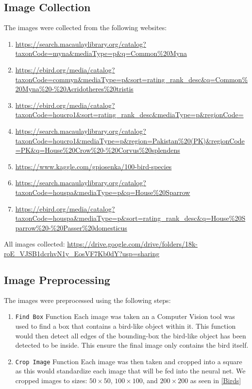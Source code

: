 \documentclass{article}
\begin{document}
    \subsection*{Image Collection}
    The images were collected from the following websites:
    \begin{enumerate}
        \item \url{https://search.macaulaylibrary.org/catalog?taxonCode=myna&mediaType=p&q=Common%20Myna}
        \item \url{https://ebird.org/media/catalog?taxonCode=commyn&mediaType=p&sort=rating_rank_desc&q=Common%20Myna%20-%20Acridotheres%20tristis}
        \item \url{https://ebird.org/media/catalog?taxonCode=houcro1&sort=rating_rank_desc&mediaType=p&regionCode=}
        \item \url{https://search.macaulaylibrary.org/catalog?taxonCode=houcro1&mediaType=p&region=Pakistan%20(PK)&regionCode=PK&q=House%20Crow%20-%20Corvus%20splendens}
        \item \url{https://www.kaggle.com/gpiosenka/100-bird-species}
        \item \url{https://search.macaulaylibrary.org/catalog?taxonCode=houspa&mediaType=p&q=House%20Sparrow}
        \item \url{https://ebird.org/media/catalog?taxonCode=houspa&mediaType=p&sort=rating_rank_desc&q=House%20Sparrow%20-%20Passer%20domesticus}
    \end{enumerate}     
    All images collected: \url{https://drive.google.com/drive/folders/18k-roE_VJSB1dcrhvN1y_EosVF7Kb0dY?usp=sharing}
    \subsection*{Image Preprocessing}
    The images were preprocessed using the following steps:
    \begin{enumerate}
        \item \texttt{Find Box} Function \newline 
        Each image was taken an a Computer Vision tool was used to find a box that contains a bird-like object within it. This function would then detect all edges of the bounding-box the bird-like object has been detected to be inside. This ensure the final image only contains the bird itself.
        \item \texttt{Crop Image} Function  \newline
        Each image was then taken and cropped into a square as this would standardize each image that will be fed into the neural net. We cropped images to sizes: $50\times 50$, $100\times 100$, and $200\times 200$ as seen in \ref{Birds}
    \end{enumerate}
\end{document}
